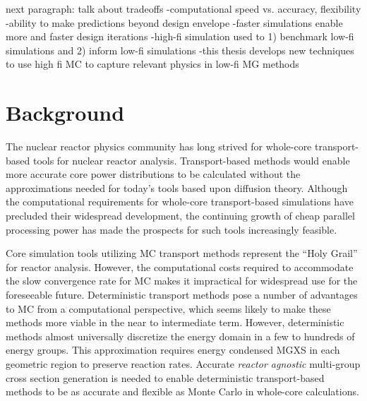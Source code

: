 next paragraph: talk about tradeoffs
-computational speed vs. accuracy, flexibility
-ability to make predictions beyond design envelope
-faster simulations enable more and faster design iterations 
-high-fi simulation used to 1) benchmark low-fi simulations and 2) inform low-fi simulations
-this thesis develops new techniques to use high fi MC to capture relevant physics in low-fi MG methods


\section{Background}
\label{sec:chap1-background}


The nuclear reactor physics community has long strived for whole-core transport-based tools for nuclear reactor analysis. Transport-based methods would enable more accurate core power distributions to be calculated without the approximations needed for today’s tools based upon diffusion theory. Although the computational requirements for whole-core transport-based simulations have precluded their widespread development, the continuing growth of cheap parallel processing power has made the prospects for such tools increasingly feasible.


Core simulation tools utilizing \ac{MC} transport methods represent the ``Holy Grail'' for reactor analysis. However, the computational costs required to accommodate the slow convergence rate for \ac{MC} makes it impractical for widespread use for the foreseeable future. Deterministic transport methods pose a number of advantages to \ac{MC} from a computational perspective, which seems likely to make these methods more viable in the near to intermediate term. However, deterministic methods almost universally discretize the energy domain in a few to hundreds of energy groups. This approximation requires energy condensed \ac{MGXS} in each geometric region to preserve reaction rates. Accurate \emph{reactor agnostic} multi-group cross section generation is needed to enable deterministic transport-based methods to be as accurate and flexible as Monte Carlo in whole-core calculations.

